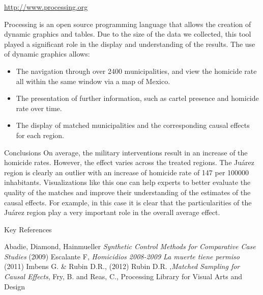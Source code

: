 \documentclass[final]{beamer}
\newlength{\onecolwid}
\begin{document}
\begin{frame}[t]
\begin{columns}[t]
\begin{column}{\onecolwid}
\begin{block}{\url{http://www.processing.org}}
\begin{figure}[htdp]
{          }
        \end{figure}
	Processing is an open source programming language that allows the creation of dynamic graphics and tables. Due to the size of the data we collected, this tool played a significant role in the display and understanding of the results. The use of dynamic graphics allows:
        \begin{itemize}
          \item The navigation through over 2400 municipalities, and view the homicide rate all within the same window via a map of Mexico.
          \item The presentation of further information, such as cartel presence and homicide rate over time.
          \item The display of matched municipalities and the corresponding causal effects for each region.
        \end{itemize}		
      \end{block}
      \begin{block}{Conclusions}
 	On average, the military interventions result in an increase of the homicide rates. However, the effect varies across the treated regions. The Ju\'{a}rez region is clearly an outlier with an increase of homicide rate of 147 per 100000 inhabitants. 
       Visualizations like this one can help experts to better evaluate the quality of the matches and improve their understanding of the estimates of the causal effects. For example, in this case it is clear that the particularities of the Ju\'{a}rez region play a very important role in the overall average effect. 
      \end{block}
      \begin{block}{Key References }

        
	\vspace{-0.5cm}
        \footnotesize{\begin{thebibliography}{99}
           Abadie, Diamond, Hainmueller  \emph{Synthetic Control Methods for Comparative Case Studies} (2009)
           Escalante F, \emph{Homicidios 2008-2009 La muerte tiene permiso} (2011)
           Imbens G. \& Rubin D.R., (2012)
           Rubin D.R. ,\emph{Matched Sampling for Causal Effects},
 Fry, B. and Reas, C., Processing Library for Visual Arts and Design
          \end{thebibliography}}        
      \end{block}


\end{column}
\end{columns}
\end{frame}
\end{document}
